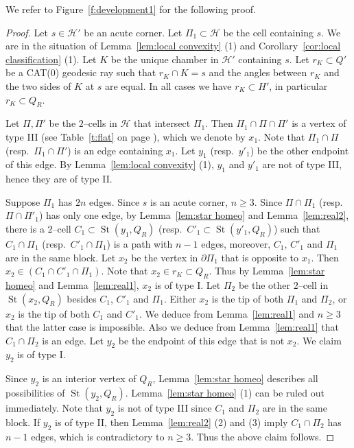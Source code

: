 \documentclass[11pt]{amsart}
\newcommand{\St}{\operatorname{St}}
\newcommand {\h}{\mathcal H}
\theoremstyle{definition}
\begin{document}
We refer to Figure~\ref{f:development1} for the following proof.
\begin{proof}
Let $s\in\h'$ be an acute corner. Let $\Pi_1\subset\h$ be the cell containing $s$. We are in the situation of Lemma~\ref{lem:local convexity} (1) and Corollary~\ref{cor:local classification} (1). Let $K$ be the unique chamber in $\h'$ containing $s$. Let $r_K\subset Q'$ be a CAT(0) geodesic ray such that $r_K\cap K=s$ and the angles between $r_K$ and the two sides of $K$ at $s$ are equal. In all cases we have $r_K\subset H'$, in particular $r_K\subset Q_R$.

Let $\Pi,\Pi'$ be the $2$--cells in $\h$ that intersect $\Pi_1$. Then $\Pi_1\cap\Pi\cap \Pi'$ is a vertex of type III (see Table~\ref{t:flat} on page \pageref{t:flat}), which we denote by $x_1$. Note that $\Pi_1\cap \Pi$ (resp.\ $\Pi_1\cap\Pi'$) is an edge containing $x_1$. Let $y_1$ (resp.\ $y'_1$) be the other endpoint of this edge. By Lemma~\ref{lem:local convexity} (1), $y_1$ and $y'_1$ are not of type III, hence they are of type II.

Suppose $\Pi_1$ has $2n$ edges. Since $s$ is an acute corner, $n\ge 3$. Since $\Pi\cap\Pi_1$ (resp.\ $\Pi\cap\Pi'_1$) has only one edge, by Lemma~\ref{lem:star homeo} and Lemma~\ref{lem:real2}, there is a $2$--cell $C_1\subset \St(y_1,Q_R)$ (resp.\ $C'_1\subset\St(y'_1,Q_R)$) such that $C_1\cap \Pi_1$ (resp.\ $C'_1\cap\Pi_1$) is a path with $n-1$ edges, moreover, $C_1$, $C'_1$ and $\Pi_1$ are in the same block. Let $x_2$ be the vertex in $\partial\Pi_1$ that is opposite to $x_1$. Then $x_2\in (C_1\cap C'_1\cap\Pi_1)$. Note that $x_2\in r_K\subset Q_R$. Thus by Lemma~\ref{lem:star homeo} and Lemma~\ref{lem:real1}, $x_2$ is of type I. Let $\Pi_2$ be the other $2$--cell in $\St(x_2,Q_R)$ besides $C_1$, $C'_1$ and $\Pi_1$. Either $x_2$ is the tip of both $\Pi_1$ and $\Pi_2$, or $x_2$ is the tip of both $C_1$ and $C'_1$. We deduce from Lemma~\ref{lem:real1} and $n\ge 3$ that the latter case is impossible. Also we deduce from Lemma~\ref{lem:real1} that $C_1\cap \Pi_2$ is an edge. Let $y_2$ be the endpoint of this edge that is not $x_2$. We claim $y_2$ is of type I.

Since $y_2$ is an interior vertex of $Q_R$, Lemma~\ref{lem:star homeo} describes all possibilities of $\St(y_2,Q_R)$. Lemma~\ref{lem:star homeo} (1) can be ruled out immediately. Note that $y_2$ is not of type III since $C_1$ and $\Pi_2$ are in the same block. If $y_2$ is of type II, then Lemma~\ref{lem:real2} (2) and (3) imply $C_1\cap\Pi_2$ has $n-1$ edges, which is contradictory to $n\ge 3$. Thus the above claim follows.


\end{proof}
\end{document}
